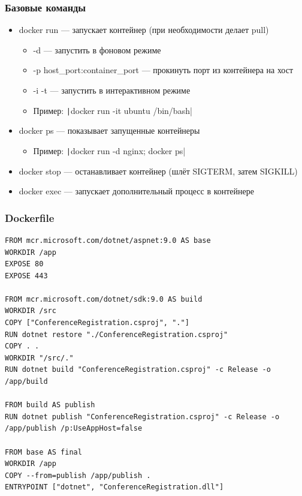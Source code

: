\documentclass{../../slides-style}
\begin{document}
    \begin{frame}
        \frametitle{Базовые команды}
        \begin{itemize}
            \item docker run --- запускает контейнер (при необходимости делает pull)
            \begin{itemize}
                \item -d --- запустить в фоновом режиме
                \item -p host\_port:container\_port --- прокинуть порт из контейнера на хост
                \item -i -t --- запустить в интерактивном режиме
                \item Пример: \texttt|docker run -it ubuntu /bin/bash|
            \end{itemize}
            \item docker ps --- показывает запущенные контейнеры
            \begin{itemize}
                \item Пример: \texttt|docker run -d nginx; docker ps|
            \end{itemize}
            \item docker stop --- останавливает контейнер (шлёт SIGTERM, затем SIGKILL)
            \item docker exec --- запускает дополнительный процесс в контейнере
        \end{itemize}
    \end{frame}

    \begin{frame}[fragile]
        \frametitle{Dockerfile}
        \begin{scriptsize}
            \begin{verbatim}
FROM mcr.microsoft.com/dotnet/aspnet:9.0 AS base
WORKDIR /app
EXPOSE 80
EXPOSE 443

FROM mcr.microsoft.com/dotnet/sdk:9.0 AS build
WORKDIR /src
COPY ["ConferenceRegistration.csproj", "."]
RUN dotnet restore "./ConferenceRegistration.csproj"
COPY . .
WORKDIR "/src/."
RUN dotnet build "ConferenceRegistration.csproj" -c Release -o /app/build

FROM build AS publish
RUN dotnet publish "ConferenceRegistration.csproj" -c Release -o /app/publish /p:UseAppHost=false

FROM base AS final
WORKDIR /app
COPY --from=publish /app/publish .
ENTRYPOINT ["dotnet", "ConferenceRegistration.dll"]
            \end{verbatim}
        \end{scriptsize}
    \end{frame}
\end{document}
